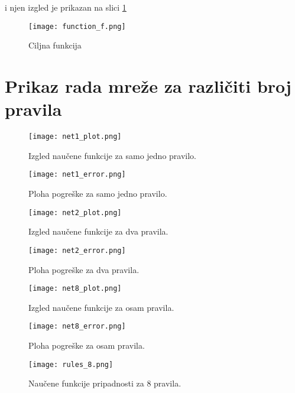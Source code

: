 \documentclass{article}
\begin{document}
i njen izgled je prikazan na slici \ref{fig:function_f}

\begin{figure}
  \texttt{[image: function\_f.png]}
  \caption{Ciljna funkcija} %
  \label{fig:function_f}
\end{figure}


\section{Prikaz rada mreže za različiti broj pravila}

\begin{figure}
  \texttt{[image: net1\_plot.png]}
  \caption{Izgled naučene funkcije za samo jedno pravilo.}
  \label{fig:net1_plot}
\end{figure}

\begin{figure}
  \texttt{[image: net1\_error.png]}
  \caption{Ploha pogreške za samo jedno pravilo.}
  \label{fig:net1_error}
\end{figure}

\begin{figure}
  \texttt{[image: net2\_plot.png]}
  \caption{Izgled naučene funkcije za dva pravila.}
  \label{fig:net2_plot}
\end{figure}

\begin{figure}
  \texttt{[image: net2\_error.png]}
  \caption{Ploha pogreške za dva pravila.}
  \label{fig:net2_error}
\end{figure}

\begin{figure}
  \texttt{[image: net8\_plot.png]}
  \caption{Izgled naučene funkcije za osam pravila.}
  \label{fig:net8_plot}
\end{figure}

\begin{figure}
  \texttt{[image: net8\_error.png]}
  \caption{Ploha pogreške za osam pravila.}
  \label{fig:net8_error}
\end{figure}

\begin{figure}
  \texttt{[image: rules\_8.png]}
  \caption{Naučene funkcije pripadnosti za 8 pravila.}
  \label{fig:rules_8}
\end{figure}
\end{document}
